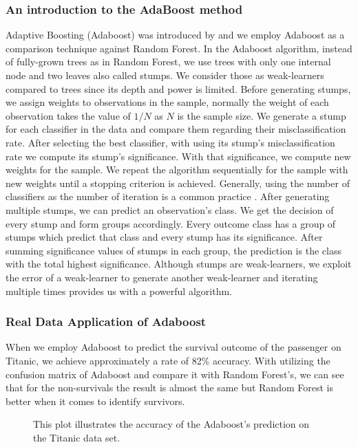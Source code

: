 \subsubsection{An introduction to the AdaBoost method}
Adaptive Boosting (Adaboost) was introduced by \cite{freund1997boosting} and we employ Adaboost as a comparison 
technique against Random Forest. In the Adaboost algorithm, instead of fully-grown trees as in Random Forest, 
we use trees with only one internal node and two leaves also called stumps. We consider those as weak-learners 
compared to trees since its depth and power is limited. Before generating stumps, 
we assign weights to observations in the sample, normally the weight of each observation takes the value 
of $1/N$ as $N$ is the sample size. We generate a stump for each classifier in the data and compare them regarding 
their misclassification rate. After selecting the best classifier, with using its stump's misclassification rate 
we compute its stump's significance. With that significance, we compute new weights for the sample. 
We repeat the algorithm sequentially for the sample with new weights until a stopping criterion is achieved. 
Generally, using the number of classifiers as the number of iteration is a common practice \cite{friedman2001elements}. 
After generating multiple stumps, we can predict an observation's class. 
We get the decision of every stump and form groups accordingly. 
Every outcome class has a group of stumps which predict that class and every stump has its significance. 
After summing significance values of stumps in each group, the prediction is the class with the total highest significance. 
Although stumps are weak-learners, we exploit the error of a weak-learner to generate another weak-learner 
and iterating multiple times provides us with a powerful algorithm.

\subsubsection{Real Data Application of Adaboost}
When we employ Adaboost to predict the survival outcome of the passenger on Titanic, we achieve approximately a rate of 82\% accuracy. With utilizing the confusion matrix of Adaboost and compare it with Random Forest's, we can see that for the non-survivals the result is almost the same but Random Forest is better when it comes to identify survivors.

\begin{figure}[H]
    \captionsetup{format=plain}
    \caption
        {This plot illustrates the accuracy of the Adaboost's prediction on the Titanic data set.
        }
    \label{fig:confusion_matrix_adaboost}
\end{figure}


